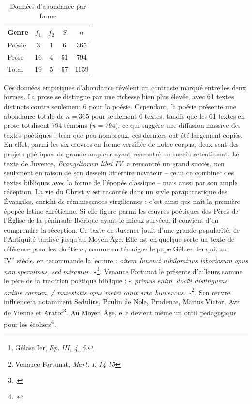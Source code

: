 \documentclass[a4paper,twoside,12pt]{book}
\begin{document}
\begin{table}[h]
	\centering
	\begin{tabular}{lcccc}
		\hline
		\textbf{Genre} & \textbf{$f_1$} & \textbf{$f_2$} & \textbf{$S$} & \textbf{$n$} \\
		\hline
		Poésie & 3 & 1 & 6 & 365 \\
		Prose & 16 & 4 & 61 & 794 \\
		Total & 19 & 5 & 67 & 1159 \\
		\hline
	\end{tabular}
	\caption{Données d'abondance par forme}
\end{table}


Ces données empiriques d’abondance révèlent un contraste marqué entre les deux formes. La prose se distingue par une richesse bien plus élevée, avec 61 textes distincts contre seulement 6 pour la poésie. Cependant, la poésie présente une abondance totale de $n = 365$ pour seulement 6 textes, tandis que les 61 textes en prose totalisent 794 témoins ($n = 794$), ce qui suggère une diffusion massive des textes poétiques : bien que peu nombreux, ces derniers ont été largement copiés. En effet, parmi les six œuvres en forme versifiée de notre corpus, deux sont des projets poétiques de grande ampleur ayant rencontré un succès retentissant.
Le texte de Juvence, \textit{Evangeliorum libri IV}, a rencontré un grand succès, non seulement en raison de son dessein littéraire novateur – celui de combiner des textes bibliques avec la forme de l’épopée classique – mais aussi par son ample réception. La vie du Christ y est racontée dans un style paraphrastique des Évangiles, enrichi de réminiscences virgiliennes : c’est ainsi que naît la première épopée latine chrétienne. Si elle figure parmi les œuvres poétiques des Pères de l’Église de la péninsule Ibérique ayant le mieux survécu, il convient d’en comprendre la réception. Ce texte de Juvence jouit d’une grande popularité, de l’Antiquité tardive jusqu’au Moyen-Âge. Elle est en quelque sorte un texte de référence pour les chrétiens, comme en témoigne le pape Gélase~Ier qui, au IV\textsuperscript{e}~siècle, en recommande la lecture : «\textit{item Iuuenci nihilominus laboriosum opus non spernimus, sed miramur.} »\footnote{Gélase Ier, \textit{Ep. III, 4, 5}.}. Venance Fortunat le présente d’ailleurs comme le père de la tradition poétique biblique : «\textit{ primus enim, docili distinguens ordine carmen, / maiestatis opus metri canit arte Iuuvencus.} »\footnote{Venance Fortunat, \textit{
Mart. I, 14-15}}. Son œuvre influencera notamment Sedulius, Paulin de Nole, Prudence, Marius Victor, Avit de Vienne et Arator\footcite[351-352]{green2004juvencus}. Au Moyen Âge, elle devient même un outil pédagogique pour les écoliers\footcite[49]{curtius2013european}.
\end{document}
